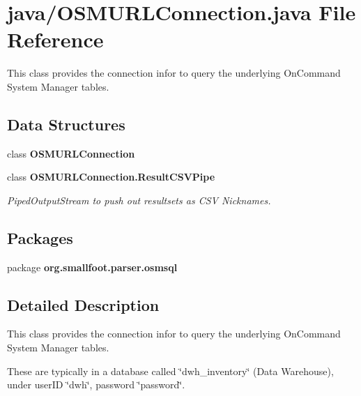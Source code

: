\section{java/\+O\+S\+M\+U\+R\+L\+Connection.java File Reference}
\label{OSMURLConnection_8java}


This class provides the connection infor to query the underlying On\+Command System Manager tables.  


\subsection*{Data Structures}
\begin{DoxyCompactItemize}
\item 
class {\bf O\+S\+M\+U\+R\+L\+Connection}
\item 
class {\bf O\+S\+M\+U\+R\+L\+Connection.\+Result\+C\+S\+V\+Pipe}
\begin{DoxyCompactList}\small\item\em Piped\+Output\+Stream to push out resultsets as C\+S\+V Nicknames. \end{DoxyCompactList}\end{DoxyCompactItemize}
\subsection*{Packages}
\begin{DoxyCompactItemize}
\item 
package {\bf org.\+smallfoot.\+parser.\+osmsql}
\end{DoxyCompactItemize}


\subsection{Detailed Description}
This class provides the connection infor to query the underlying On\+Command System Manager tables. 

These are typically in a database called \char`\"{}dwh\+\_\+inventory\char`\"{} (Data Warehouse), under user\+I\+D \char`\"{}dwh\char`\"{}, password \char`\"{}password\char`\"{}. 